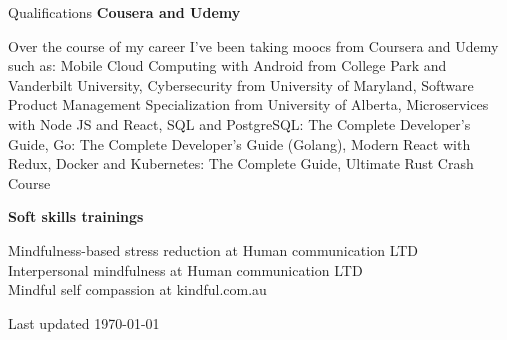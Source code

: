 \documentclass{resume}
\begin{document}
\begin{rSection}{Qualifications}
    {\bf Cousera and Udemy}
    
    Over the course of my career I've been taking moocs from Coursera and Udemy such as:
    Mobile Cloud Computing with Android from College Park and Vanderbilt University,
    Cybersecurity from University of Maryland,
    Software Product Management Specialization from University of Alberta, 
    Microservices with Node JS and React,
    SQL and PostgreSQL: The Complete Developer's Guide,
    Go: The Complete Developer's Guide (Golang),
    Modern React with Redux,
    Docker and Kubernetes: The Complete Guide,
    Ultimate Rust Crash Course	
    
   {\bf Soft skills trainings}
   
    Mindfulness-based stress reduction at Human communication LTD\\
    Interpersonal mindfulness at Human communication LTD\\
    Mindful self compassion at kindful.com.au\\
  \end{rSection}


  \begin{rSection}{}
    Last updated \today 
  \end{rSection}
\end{document}
